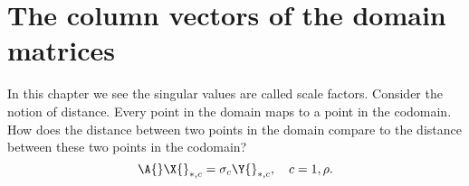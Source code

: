\section[The column vectors]{The column vectors of the domain matrices}
In this chapter we see the singular values are called scale factors. Consider the notion of distance. Every point in the domain maps to a point in the codomain. How does the distance between two points in the domain compare to the distance between these two points in the codomain?
\begin{equation}
  \A{}\X{}_{*,c} = \sigma_{c} \Y{}_{*,c}, \quad c = 1, \rho.
\end{equation}

\endinput